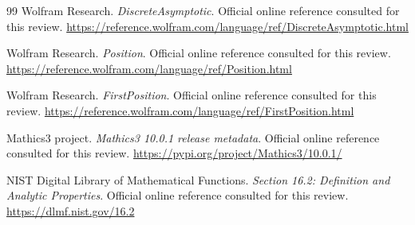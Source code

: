 \documentclass[11pt,letterpaper]{article}
\begin{document}
\begin{thebibliography}{99}
 Wolfram Research. \emph{DiscreteAsymptotic}. Official online reference consulted for this review.\newline
\url{https://reference.wolfram.com/language/ref/DiscreteAsymptotic.html}

 Wolfram Research. \emph{Position}. Official online reference consulted for this review.\newline
\url{https://reference.wolfram.com/language/ref/Position.html}

 Wolfram Research. \emph{FirstPosition}. Official online reference consulted for this review.\newline
\url{https://reference.wolfram.com/language/ref/FirstPosition.html}

 Mathics3 project. \emph{Mathics3 10.0.1 release metadata}. Official online reference consulted for this review.\newline
\url{https://pypi.org/project/Mathics3/10.0.1/}

 NIST Digital Library of Mathematical Functions. \emph{Section 16.2: Definition and Analytic Properties}. Official online reference consulted for this review.\newline
\url{https://dlmf.nist.gov/16.2}

\end{thebibliography}
\end{document}
